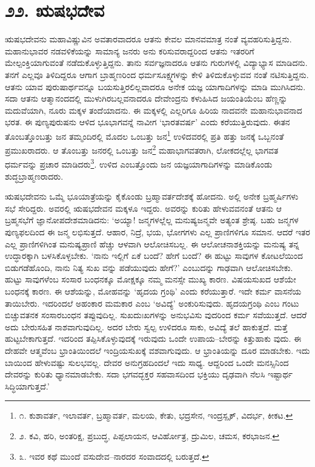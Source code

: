 
\chapter{೨೨. ಋಷಭದೇವ}

ಋಷಭದೇವನು ಮಹಾವಿಷ್ಣುವಿನ ಅವತಾರವಾದರೂ ಆತನು ಕೇವಲ ಮಾನವಮಾತ್ರ ನಂತೆ ವ್ಯವಹರಿಸುತ್ತಿದ್ದನು. ಮಹಾನುಭಾವರ ನಡವಳಿಕೆಯನ್ನು ಸಾಮಾನ್ಯ ಜನರು ಅನು ಕರಿಸುವರಾದ್ದರಿಂದ ಆತನು ಇತರರಿಗೆ ಮೇಲ್ಪಂಕ್ತಿಯಾಗುವಂತೆ ನಡೆದುಕೊಳ್ಳುತ್ತಿದ್ದನು. ತಾನು ಸರ್ವಜ್ಞನಾದರೂ ಆತನು ಗುರುಗಳಲ್ಲಿ ವಿದ್ಯಾಭ್ಯಾಸ ಮಾಡಿದನು. ತನಗೆ ಎಲ್ಲವೂ ತಿಳಿದಿದ್ದರೂ ಆಗಾಗ ಬ್ರಾಹ್ಮಣರಿಂದ ಧರ್ಮಸೂಕ್ಷ್ಮಗಳನ್ನು ಕೇಳಿ ತಿಳಿದುಕೊಳ್ಳುವವ ನಂತೆ ನಟಿಸುತ್ತಿದ್ದನು. ಆತನು ಯಾವ ಪುರುಷಾರ್ಥವನ್ನೂ ಬಯಸುತ್ತಿರಲಿಲ್ಲವಾದರೂ ಅನೇಕ ಯಜ್ಞ ಯಾಗಾದಿಗಳನ್ನು ಮಾಡಿ ಮುಗಿಸಿದನು. ಸದಾ ಆತನು ಆತ್ಮಾನಂದದಲ್ಲಿ ಮುಳುಗಿರಬಲ್ಲವನಾದರೂ ದೇವೇಂದ್ರನು ಕಳುಹಿಸಿದ ಜಯಂತಿಯೆಂಬ ಹೆಣ್ಣನ್ನು ಮದುವೆಯಾಗಿ, ನೂರು ಮಕ್ಕಳ ತಂದೆಯಾದನು. ಈ ಮಕ್ಕಳಲ್ಲಿ ಎಲ್ಲರಿಗೂ ಹಿರಿಯ ನಾದವನೇ ಮಹಾನುಭಾವನಾದ ಭರತ. ಈ ಪುಣ್ಯಪುರುಷನು ಆಳಿದ ಭೂಭಾಗವನ್ನೆ ನಾವೀಗ ‘ಭಾರತವರ್ಷ’ ಎಂದು ಕರೆಯುತ್ತಿರುವುದು. ಈತನ ತೊಂಬತ್ತೊಂಬತ್ತು ಜನ ತಮ್ಮಂದಿರಲ್ಲಿ ಮೊದಲ ಒಂಬತ್ತು ಜನ\footnote{೧. ಕುಶಾವರ್ತ, ಇಲಾವರ್ತ, ಬ್ರಹ್ಮಾವರ್ತ, ಮಲಯ, ಕೇತು, ಭದ್ರಸೇನ, ಇಂದ್ರಸ್ಪೃಕ್, ವಿದರ್ಭ, ಕೀಕಟ.} ಉಳಿದವರಲ್ಲಿ ಪ್ರತಿ ಹತ್ತು ಜನಕ್ಕೆ ಒಬ್ಬನಂತೆ ಪ್ರಮುಖರಾದರು. ಆ ತೊಂಬತ್ತು ಜನರಲ್ಲಿ ಒಂಬತ್ತು ಜನ\footnote{೨. ಕವಿ, ಹರಿ, ಅಂತರಿಕ್ಷ, ಪ್ರಬುದ್ಧ, ಪಿಪ್ಪಲಾಯನ, ಆವಿರ್ಹೋತ್ರ, ದ್ರುಮಿಲ, ಚಮಸ, ಕರಭಾಜನ.} ಮಹಾಭಾಗವತರಾಗಿ, ಲೋಕದಲ್ಲೆಲ್ಲ ಭಾಗವತ ಧರ್ಮವನ್ನು ಪ್ರಚಾರ ಮಾಡಿದರು\footnote{೩. ಇವರ ಕಥೆ ಮುಂದೆ ವಸುದೇವ–ನಾರದರ ಸಂವಾದದಲ್ಲಿ ಬರುತ್ತದೆ.}. ಉಳಿದ ಎಂಬತ್ತೊಂದು ಜನ ಯಜ್ಞಯಾಗಾದಿಗಳನ್ನು ಮಾಡಿಕೊಂಡು ಶುದ್ಧಬ್ರಾಹ್ಮಣರಾದರು.

ಋಷಭದೇವನು ಒಮ್ಮೆ ಭೂಯಾತ್ರೆಯನ್ನು ಕೈಕೊಂಡು ಬ್ರಹ್ಮಾವರ್ತದೇಶಕ್ಕೆ ಹೋದನು. ಅಲ್ಲಿ ಅನೇಕ ಬ್ರಹ್ಮರ್ಷಿಗಳು ಸಭೆ ಸೇರಿದ್ದರು. ಅವರಲ್ಲಿ ಋಷಭದೇವನ ಮಕ್ಕಳೂ ಇದ್ದರು. ಅವರನ್ನು ಕುರಿತು ಹೇಳುವವನಂತೆ ಆತನು ಆ ಬ್ರಹ್ಮಸಭೆಗೆ ಜ್ಞಾನೋಪದೇಶಮಾಡಿದನು: ‘ಅಯ್ಯಾ! ಜನ್ಮಗಳಲ್ಲೆಲ್ಲ ಮನುಷ್ಯಜನ್ಮವೇ ಅತ್ಯಂತ ಶ್ರೇಷ್ಠ. ಬಹು ಜನ್ಮಗಳ ಪುಣ್ಯಫಲದಿಂದ ಈ ಜನ್ಮ ಲಭಿಸುತ್ತದೆ. ಆಹಾರ, ನಿದ್ರೆ, ಭಯ, ಭೋಗಗಳು ಎಲ್ಲ ಪ್ರಾಣಿಗಳಿಗೂ ಸಮಾನ. ಆದರೆ ಇತರ ಎಲ್ಲ ಪ್ರಾಣಿಗಳಿಗಿಂತ ಮನುಷ್ಯಪ್ರಾಣಿ ಹೆಚ್ಚು ಆಳವಾಗಿ ಆಲೋಚಿಸಬಲ್ಲ. ಈ ಆಲೋಚನಾಶಕ್ತಿಯನ್ನು ಮನುಷ್ಯ ತನ್ನ ಉದ್ಧಾರಕ್ಕಾಗಿ ಬಳಸಿಕೊಳ್ಳಬೇಕು. ‘ನಾನು ಇಲ್ಲಿಗೆ ಏಕೆ ಬಂದೆ? ಹೇಗೆ ಬಂದೆ? ಈ ಹುಟ್ಟು ಸಾವುಗಳ ಕೋಟಲೆಯಿಂದ ಬಿಡುಗಡೆಹೊಂದಿ, ನಾನು ನಿತ್ಯ ಸುಖ ವನ್ನು ಪಡೆಯುವುದು ಹೇಗೆ?’ ಎಂಬುದನ್ನು ಗಾಢವಾಗಿ ಆಲೋಚಿಸಬೇಕು. ಹುಟ್ಟು ಸಾವುಗಳೆಂಬ ಸಂಸಾರ ಬಂಧನಕ್ಕೂ ಮೋಕ್ಷಕ್ಕೂ ನಮ್ಮ ಮನಸ್ಸೇ ಮುಖ್ಯ ಕಾರಣ. ವಿಷಯಸುಖದ ಆಶೆಯೇ ಬಂಧನಕ್ಕೆ ಕಾರಣ. ಈ ಆಶೆಯನ್ನು, ಮೋಹವನ್ನು ‘ಹೃದಯ ಗ್ರಂಥಿ’ ಎಂದು ಕರೆಯುತ್ತಾರೆ. ಇದೇ ಕರ್ಮ ವಾಸನೆಯ ತಾಯಿಬೇರು. ಇದರಿಂದಲೆ ಅಹಂಕಾರ ಮಮಕಾರ ಎಂಬ ‘ಅವಿದ್ಯೆ’ ಅಂಕುರಿಸುವುದು. ಹೃದಯಗ್ರಂಥಿ ಎಂಬ ಗಂಟು ಬಿಚ್ಚುವತನಕ ಸಂಸಾರಬಂಧನ ತಪ್ಪುವುದಿಲ್ಲ. ಸುಖದುಃಖಗಳನ್ನು ಅನುಭವಿಸು ವುದರಿಂದ ಕರ್ಮ ಸವೆಯುತ್ತದೆ. ಆದರೆ ಅದು ಬೇರುಸಹಿತ ನಾಶವಾಗುವುದಿಲ್ಲ. ಅದರ ಬೇರು ಸ್ವಲ್ಪ ಉಳಿದರೂ ಸಾಕು, ಅವಿದ್ಯೆ ತಲೆ ಹಾಕುತ್ತದೆ. ಮತ್ತೆ ಹುಟ್ಟಬೇಕಾಗುತ್ತದೆ. ಇದರಿಂದ ತಪ್ಪಿಸಿಕೊಳ್ಳುವುದಕ್ಕೆ ಇರುವುದು ಒಂದೇ ಉಪಾಯ–ಬೇರನ್ನು ಕಿತ್ತುಹಾಕು ವುದು. ಈ ದೇಹವೇ ಆತ್ಮವೆಂಬ ಭ್ರಾಂತಿಯಿಂದಲೆ ಇಂದ್ರಿಯಸುಖಕ್ಕೆ ವಶವಾಗುವುದು. ಆ ಭ್ರಾಂತಿಯನ್ನು ದೂರ ಮಾಡಬೇಕು. ಇದು ಬಾಯಿಂದ ಹೇಳುವಷ್ಟು ಸುಲಭವಲ್ಲ. ದೇವರ ಅನುಗ್ರಹದಿಂದಲೆ ಇದು ಸಾಧ್ಯ. ಆದ್ದರಿಂದ ಒಂದೇ ಮನಸ್ಸಿನಿಂದ ದೇವರನ್ನು ಕುರಿತು ಧ್ಯಾನಮಾಡಬೇಕು. ಸದಾ ಭಗವದ್ಭಕ್ತರ ಸಹವಾಸದಿಂದ ಭಕ್ತಿಯು ದೃಢವಾಗಿ ನೆಲಸಿ ಇಷ್ಟಾರ್ಥ ಸಿದ್ಧಿಯಾಗುತ್ತದೆ.’

